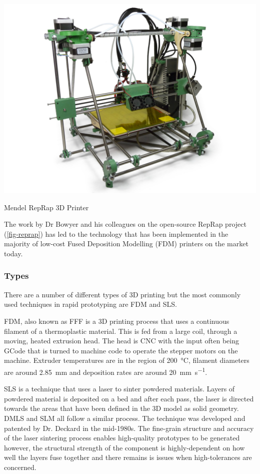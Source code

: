 \begin{marginfigure}
  \centering
  \includegraphics[width=\textwidth]{figs/mendel.jpg}
  \caption{Mendel RepRap 3D Printer}
  \label{fig-reprap}
\end{marginfigure}

The work by Dr Bowyer and his colleagues on the open-source RepRap project (\cref{fig-reprap}) has led to the technology that has been implemented in the majority of low-cost Fused Deposition Modelling (FDM) printers on the market today.~\cite{jones2011}


\subsubsection{Types}

There are a number of different types of 3D printing but the most commonly used techniques in rapid prototyping are \acf{FDM} and \acf{SLS}.

\ac{FDM}, also known as \acf{FFF} is a 3D printing process that uses a continuous filament of a thermoplastic material. This is fed from a large coil, through a moving, heated extrusion head. The head is \acf{CNC} with the input often being GCode that is turned to machine code to operate the stepper motors on the machine. Extruder temperatures are in the region of \SI{200}{\degreeCelsius}, filament diameters are around \SI{2.85}{\milli\metre} and deposition rates are around \SI{20}{\milli\metre\per\second}.

\ac{SLS} is a technique that uses a laser to sinter powdered materials. Layers of powdered material is deposited on a bed and after each pass, the laser is directed towards the areas that have been defined in the 3D model as solid geometry. \acf{DMLS} and \acf{SLM} all follow a similar process. The technique was developed and patented by Dr. Deckard in the mid-1980s. The fine-grain structure and accuracy of the laser sintering process enables high-quality prototypes to be generated however, the structural strength of the component is highly-dependent on how well the layers fuse together and there remains is issues when high-tolerances are concerned.

